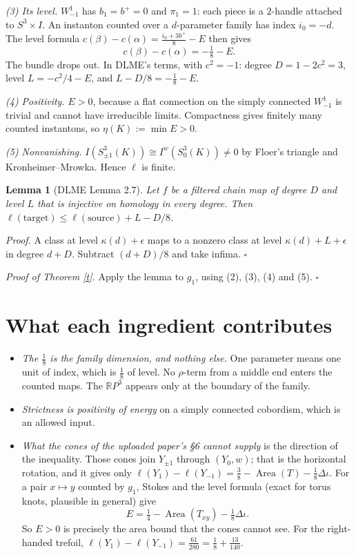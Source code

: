 \documentclass[10pt]{amsart}
\newtheorem{lem}[thm]{Lemma}
\newcommand{\st}[1]{\par\noindent\textit{#1}\enspace}
\begin{document}
\st{(3) Its level.} $W^1_{-1}$ has $b_1=b^+=0$ and $\pi_1=1$: each piece is a
$2$-handle attached to $S^3\times I$. An instanton counted over a $d$-parameter
family has index $i_0=-d$. The level formula
$c(\beta)-c(\alpha)=\frac{i_0+3b^+}8-E$ then gives
\[
c(\beta)-c(\alpha)=-\tfrac18-E .
\]
The bundle drops out. In DLME's terms, with $c^2=-1$: degree $D=1-2c^2=3$, level
$L=-c^2/4-E$, and $L-D/8=-\frac18-E$.

\st{(4) Positivity.} $E>0$, because a flat connection on the simply connected $W^1_{-1}$
is trivial and cannot have irreducible limits. Compactness gives finitely many
counted instantons, so $\eta(K):=\min E>0$.

\st{(5) Nonvanishing.} $I(S^3_{\pm1}(K))\cong I^w(S^3_0(K))\ne0$ by Floer's triangle and
Kronheimer--Mrowka. Hence $\ell$ is finite.

\begin{lem}[DLME Lemma 2.7]
Let $f$ be a filtered chain map of degree $D$ and level $L$ that is injective on
homology in every degree. Then $\ell(\text{target})\le\ell(\text{source})+L-D/8$.
\end{lem}
\noindent\emph{Proof.} A class at level $\kappa(d)+\epsilon$ maps to a nonzero class at
level $\kappa(d)+L+\epsilon$ in degree $d+D$. Subtract $(d+D)/8$ and take infima. $\square$

\noindent\emph{Proof of Theorem \ref{t}.} Apply the lemma to $g_1$, using (2), (3), (4)
and (5). $\square$

\section{What each ingredient contributes}

\begin{itemize}
\item \emph{The $\frac18$ is the family dimension, and nothing else.} One parameter means
one unit of index, which is $\frac18$ of level. No $\rho$-term from a middle end
enters the counted maps. The $\mathbb RP^3$ appears only at the boundary of the
family.
\item \emph{Strictness is positivity of energy} on a simply connected cobordism, which
is an allowed input.
\item \emph{What the cones of the uploaded paper's \S6 cannot supply} is the direction
of the inequality. Those cones join $Y_{\pm1}$ through $(Y_0,w)$; that is the
horizontal rotation, and it gives only
$\ell(Y_1)-\ell(Y_{-1})=\frac38-\operatorname{Area}(T)-\frac18\Delta\iota$. For
a pair $x\mapsto y$ counted by $g_1$, Stokes and the level formula (exact for torus
knots, plausible in general) give
\[
E=\tfrac14-\operatorname{Area}(T_{xy})-\tfrac18\Delta\iota .
\]
So $E>0$ is precisely the area bound that the cones cannot see. For the
right-handed trefoil, $\ell(Y_1)-\ell(Y_{-1})=\frac{61}{280}=\frac18+\frac{13}{140}$.
\end{itemize}
\end{document}
